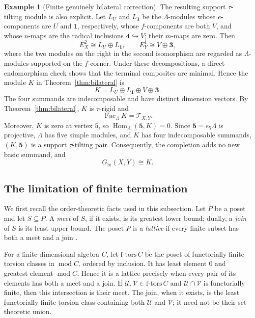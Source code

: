 \documentclass[11pt,reqno]{amsart}
\theoremstyle{definition}
\newtheorem{example}[theorem]{Example}
\theoremstyle{remark}
\newcommand{\modu}{\operatorname{mod}}
\newcommand{\Fac}{\operatorname{Fac}}
\newcommand{\Hom}{\operatorname{Hom}}
\numberwithin{equation}{section}
\begin{document}
\begin{example}[Finite genuinely bilateral correction]
The resulting support $\tau$-tilting module is also explicit.  Let $L_U$
and $L_{\mathbf1}$ be the $\Lambda$-modules whose $e$-components are $U$
and $\mathbf1$, respectively, whose $f$-components are both $V$, and whose
$n$-maps are the radical inclusions $\mathbf4\hookrightarrow V$; their
$m$-maps are zero.  Then
\[
 E_X^2\cong L_U\oplus L_{\mathbf1},
 \qquad
 E_Y^1\cong V\oplus\mathbf3,
\]
where the two modules on the right in the second isomorphism are regarded
as $\Lambda$-modules supported on the $f$-corner.  Under these
decompositions, a direct endomorphism check shows that the terminal
composites are minimal.  Hence the module $K$ in
Theorem~\ref{thm:bilateral} is
\[
 K=L_U\oplus L_{\mathbf1}\oplus V\oplus\mathbf3.
\]
The four summands are indecomposable and have distinct dimension vectors.
By Theorem~\ref{thm:bilateral}, $K$ is $\tau$-rigid and
\[
 \Fac_\Lambda K=\mathcal T_{X,Y}.
\]
Moreover, $K$ is zero at vertex $5$, so
$\Hom_\Lambda(\mathbf5,K)=0$.  Since $\mathbf5=e_5\Lambda$ is projective,
$\Lambda$ has five simple modules, and $K$ has four indecomposable summands,
$(K,\mathbf5)$ is a support $\tau$-tilting pair.  Consequently, the
completion adds no new basic summand,
and
\[
 G_{\mathrm{bi}}(X,Y)\cong K.
\]
\end{example}

\subsection{The limitation of finite termination}

We first recall the order-theoretic facts used in this subsection.  Let $P$
be a poset and let $S\subseteq P$.  A \emph{meet} of $S$, if it exists, is
its greatest lower bound; dually, a \emph{join} of $S$ is its least upper
bound.  The poset $P$ is a \emph{lattice} if every finite subset has both a
meet and a join \cite[Definition~2.2]{IRTT}.

For a finite-dimensional algebra $C$, let
$\mathrm{f\text{-}tors}\,C$ be the poset of functorially finite torsion
classes in $\modu C$, ordered by inclusion.  It has least element $0$ and
greatest element $\modu C$.  Hence it is a lattice precisely when every pair
of its elements has both a meet and a join.  If
$\mathcal U,\mathcal V\in\mathrm{f\text{-}tors}\,C$ and
$\mathcal U\cap\mathcal V$ is functorially finite, then this intersection is
their meet.  The join, when it exists, is the least functorially finite
torsion class containing both $\mathcal U$ and $\mathcal V$; it need not be
their set-theoretic union.
\end{document}
